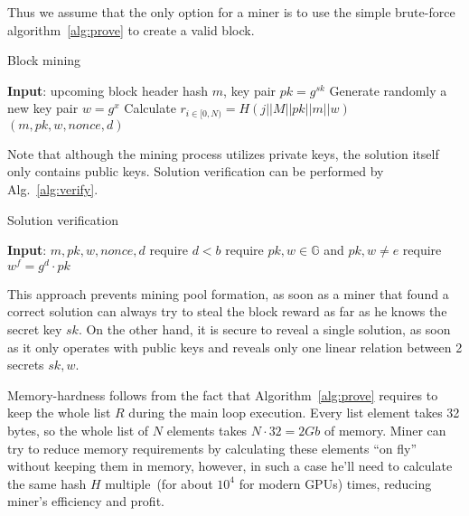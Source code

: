 Thus we assume that the only option for a miner is to use the simple brute-force algorithm~\ref{alg:prove} to
create a valid block.

\begin{algorithm}[H]
    \caption{Block mining}
    \label{alg:prove}
    \begin{algorithmic}[1]
        \State \textbf{Input}: upcoming block header hash $m$, key pair $pk=g^{sk}$
        \State Generate randomly a new key pair $w=g^x$
        \State Calculate $r_{i \in [0,N)}=H(j||M||pk||m||w)$
        \State \Return $(m,pk,w,nonce,d)$
        \EndIf
        \EndWhile
    \end{algorithmic}
\end{algorithm}


Note that although the mining process utilizes private keys, the solution itself
only contains public keys. Solution verification can be performed by Alg.~\ref{alg:verify}.

\begin{algorithm}[H]
    \caption{Solution verification}
    \label{alg:verify}
    \begin{algorithmic}[1]
        \State \textbf{Input}: $m,pk,w,nonce,d$
        \State require $d < b$
        \State require $pk,w\in \mathbb{G}$ and $pk,w \ne e$
        \State require $w^f = g^d \cdot pk$
    \end{algorithmic}
\end{algorithm}

This approach prevents mining pool formation, as soon as a miner that found a correct solution
can always try to steal the block reward as far as he knows the secret key $sk$. On the other hand,
it is secure to reveal a single solution, as soon as it only operates with public keys and reveals only one
linear relation between 2 secrets $sk, w$.

Memory-hardness follows from the fact that Algorithm~\ref{alg:prove} requires to keep
the whole list $R$ during the main loop execution.
Every list element takes 32 bytes, so the whole list of $N$ elements
takes $N \cdot 32 = 2 Gb$ of memory.
Miner can try to reduce memory requirements by calculating these elements ``on fly''
without keeping them in memory, however, in such a case he'll need to calculate the same
hash $H$ multiple~(for about $10^4$ for modern GPUs) times, reducing miner's efficiency and profit.

